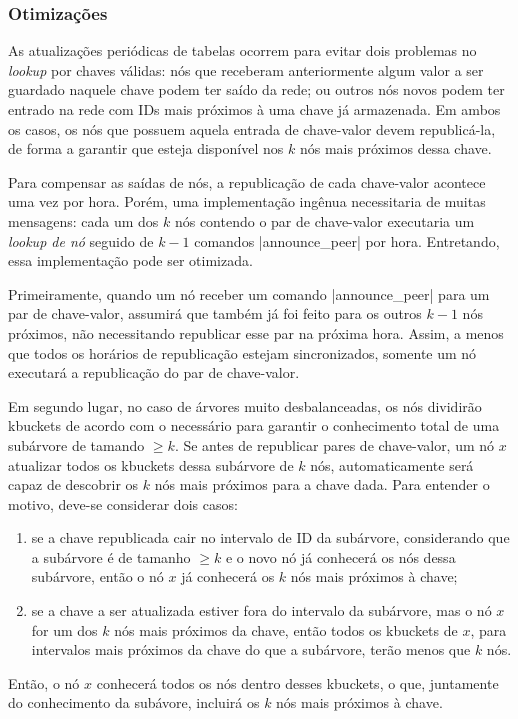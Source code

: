 
\subsubsection*{Otimizações}

As atualizações periódicas de tabelas ocorrem para evitar dois problemas no
\emph{lookup} por chaves válidas: nós que receberam anteriormente algum valor a ser
guardado naquele chave podem ter saído da rede; ou outros nós novos podem ter entrado
na rede com IDs mais próximos à uma chave já armazenada. Em ambos os casos, os nós que
possuem aquela entrada de chave-valor devem republicá-la, de forma a garantir que
esteja disponível nos $k$ nós mais próximos dessa chave.

Para compensar as saídas de nós, a republicação de cada chave-valor acontece uma vez por
hora. Porém, uma implementação ingênua necessitaria de muitas mensagens: cada um dos $k$
nós contendo o par de chave-valor executaria um \emph{lookup de nó} seguido de $k - 1$
comandos \bverb|announce_peer| por hora. Entretando, essa implementação pode ser
otimizada.

Primeiramente, quando um nó receber um comando \bverb|announce_peer| para um par de
chave-valor, assumirá que também já foi feito para os outros $k - 1$ nós próximos, não
necessitando republicar esse par na próxima hora. Assim, a menos que todos os horários
de republicação estejam sincronizados, somente um nó executará a republicação do par de
chave-valor.

Em segundo lugar, no caso de árvores muito desbalanceadas, os nós dividirão
\glspl*{kbucket} de acordo com o necessário para garantir o conhecimento total de uma
subárvore de tamando $\geq k$. Se antes de republicar pares de chave-valor, um nó $x$
atualizar todos os \glspl*{kbucket} dessa subárvore de $k$ nós, automaticamente será
capaz de descobrir os $k$ nós mais próximos para a chave dada. Para entender o motivo,
deve-se considerar dois casos:

\begin{enumerate}
    \item se a chave republicada cair no intervalo de ID da subárvore, considerando que
        a subárvore é de tamanho $\geq k$ e o novo nó já conhecerá os nós dessa
        subárvore, então o nó $x$ já conhecerá os $k$ nós mais próximos à chave;

    \item se a chave a ser atualizada estiver fora do intervalo da subárvore, mas o nó
        $x$ for um dos $k$ nós mais próximos da chave, então todos os \glspl*{kbucket}
        de $x$, para intervalos mais próximos da chave do que a subárvore, terão menos
        que $k$ nós.
\end{enumerate}

Então, o nó $x$ conhecerá todos os nós dentro desses \glspl*{kbucket}, o que,
juntamente do conhecimento da subávore, incluirá os $k$ nós mais próximos à chave.